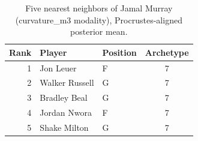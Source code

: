 \begin{table}[htbp]
  \centering\small
  \begin{tabular}{rllc}
    \toprule
    Rank & Player & Position & Archetype \\
    \midrule
    1 & Jon Leuer & F & 7 \\
    2 & Walker Russell & G & 7 \\
    3 & Bradley Beal & G & 7 \\
    4 & Jordan Nwora & F & 7 \\
    5 & Shake Milton & G & 7 \\
    \bottomrule
  \end{tabular}
  \caption{Five nearest neighbors of Jamal Murray (curvature_m3 modality), Procrustes-aligned posterior mean.}
  \label{tab:Jamal_Murray_neighbors_curvature_m3}
\end{table}

